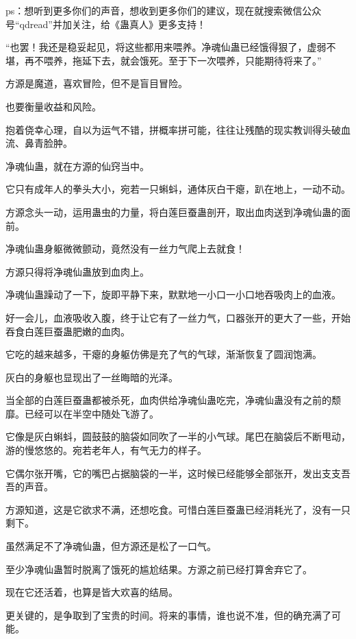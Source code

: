 
\begin{this_body}

ps：想听到更多你们的声音，想收到更多你们的建议，现在就搜索微信公众号“qdread”并加关注，给《蛊真人》更多支持！

“也罢！我还是稳妥起见，将这些都用来喂养。净魂仙蛊已经饿得狠了，虚弱不堪，再不喂养，拖延下去，就会饿死。至于下一次喂养，只能期待将来了。”

方源是魔道，喜欢冒险，但不是盲目冒险。

也要衡量收益和风险。

抱着侥幸心理，自以为运气不错，拼概率拼可能，往往让残酷的现实教训得头破血流、鼻青脸肿。

净魂仙蛊，就在方源的仙窍当中。

它只有成年人的拳头大小，宛若一只蝌蚪，通体灰白干瘪，趴在地上，一动不动。

方源念头一动，运用蛊虫的力量，将白莲巨蚕蛊剖开，取出血肉送到净魂仙蛊的面前。

净魂仙蛊身躯微微颤动，竟然没有一丝力气爬上去就食！

方源只得将净魂仙蛊放到血肉上。

净魂仙蛊躁动了一下，旋即平静下来，默默地一小口一小口地吞吸肉上的血液。

好一会儿，血液吸收入腹，终于让它有了一丝力气，口器张开的更大了一些，开始吞食白莲巨蚕蛊肥嫩的血肉。

它吃的越来越多，干瘪的身躯仿佛是充了气的气球，渐渐恢复了圆润饱满。

灰白的身躯也显现出了一丝晦暗的光泽。

当全部的白莲巨蚕蛊都被杀死，血肉供给净魂仙蛊吃完，净魂仙蛊没有之前的颓靡。已经可以在半空中随处飞游了。

它像是灰白蝌蚪，圆鼓鼓的脑袋如同吹了一半的小气球。尾巴在脑袋后不断甩动，游的慢悠悠的。宛若老年人，有气无力的样子。

它偶尔张开嘴，它的嘴巴占据脑袋的一半，这时候已经能够全部张开，发出支支吾吾的声音。

方源知道，这是它欲求不满，还想吃食。可惜白莲巨蚕蛊已经消耗光了，没有一只剩下。

虽然满足不了净魂仙蛊，但方源还是松了一口气。

至少净魂仙蛊暂时脱离了饿死的尴尬结果。方源之前已经打算舍弃它了。

现在它还活着，也算是皆大欢喜的结局。

更关键的，是争取到了宝贵的时间。将来的事情，谁也说不准，但的确充满了可能。


\end{this_body}

